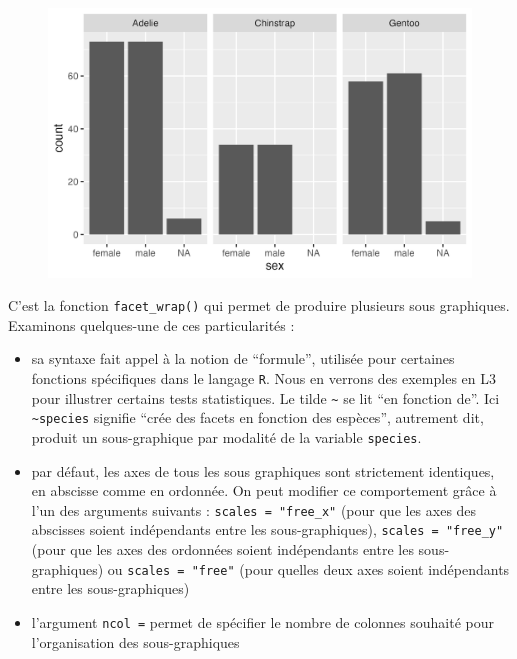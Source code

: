 \documentclass[
  letterpaper,
  DIV=11,
  numbers=noendperiod]{scrreprt}
\providecommand{\tightlist}{%
  \setlength{\itemsep}{0pt}\setlength{\parskip}{0pt}}\usepackage{longtable,booktabs,array}
\begin{document}
\begin{figure}[H]

{\centering \includegraphics{./03-visualization_files/figure-pdf/unnamed-chunk-61-1.png}

}

\end{figure}

C'est la fonction \texttt{facet\_wrap()} qui permet de produire
plusieurs sous graphiques. Examinons quelques-une de ces particularités
:

\begin{itemize}
\tightlist
\item
  sa syntaxe fait appel à la notion de ``formule'', utilisée pour
  certaines fonctions spécifiques dans le langage \texttt{R}. Nous en
  verrons des exemples en L3 pour illustrer certains tests statistiques.
  Le tilde \texttt{\textasciitilde{}} se lit ``en fonction de''. Ici
  \texttt{\textasciitilde{}species} signifie ``crée des facets en
  fonction des espèces'', autrement dit, produit un sous-graphique par
  modalité de la variable \texttt{species}.
\item
  par défaut, les axes de tous les sous graphiques sont strictement
  identiques, en abscisse comme en ordonnée. On peut modifier ce
  comportement grâce à l'un des arguments suivants :
  \texttt{scales\ =\ "free\_x"} (pour que les axes des abscisses soient
  indépendants entre les sous-graphiques), \texttt{scales\ =\ "free\_y"}
  (pour que les axes des ordonnées soient indépendants entre les
  sous-graphiques) ou \texttt{scales\ =\ "free"} (pour quelles deux axes
  soient indépendants entre les sous-graphiques)
\item
  l'argument \texttt{ncol\ =} permet de spécifier le nombre de colonnes
  souhaité pour l'organisation des sous-graphiques
\end{itemize}
\end{document}
